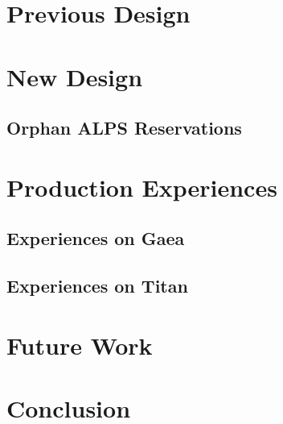 \documentclass[10pt, conference, compsocconf]{IEEEtran}
\begin{document}
\cite{alps}

\section{Previous Design}

\section{New Design}
\subsection{Orphan ALPS Reservations}

\section{Production Experiences}

\subsection{Experiences on Gaea}

\subsection{Experiences on Titan}

\section{Future Work}

\section{Conclusion}







\end{document}
